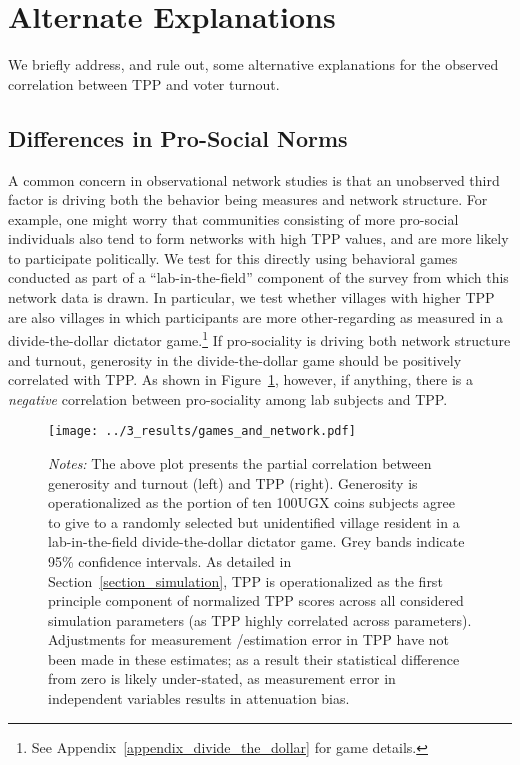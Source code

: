 \documentclass[12pt]{article}
\begin{document}
\section{Alternate Explanations}

We briefly address, and rule out, some alternative explanations for the observed correlation between TPP and voter turnout.


\subsection{Differences in Pro-Social Norms}

A common concern in observational network studies is that an unobserved third factor is driving both the behavior being measures and network structure. For example, one might worry that communities consisting of more pro-social individuals also tend to form networks with high TPP values, and are more likely to participate politically. We test for this directly using behavioral games conducted as part of a ``lab-in-the-field'' component of the survey from which this network data is drawn. In particular, we test whether villages with higher TPP are also villages in which participants are more other-regarding as measured in a divide-the-dollar dictator game.\footnote{See Appendix~\ref{appendix_divide_the_dollar} for game details.} If pro-sociality is driving both network structure and turnout, generosity in the divide-the-dollar game should be positively correlated with TPP. As shown in Figure~\ref{figure_generosity}, however, if anything, there is a \emph{negative} correlation between pro-sociality among lab subjects and TPP.

\begin{figure}[!h]
	\begin{center}
	    \caption{}\label{figure_generosity}
    		\texttt{[image: ../3\_results/games\_and\_network.pdf]}
    \end{center}
	\scriptsize{\emph{Notes:}  The above plot presents the partial correlation between generosity and turnout (left) and TPP (right). Generosity is operationalized as the portion of ten 100UGX coins subjects agree to give to a randomly selected but unidentified village resident in a lab-in-the-field divide-the-dollar dictator game.  Grey bands indicate 95\% confidence intervals. As detailed in Section~\ref{section_simulation}, TPP is operationalized as the first principle component of normalized TPP scores across all considered simulation parameters (as TPP highly correlated across parameters). Adjustments for measurement /estimation error in TPP have not been made in these estimates; as a result their statistical difference from zero is likely under-stated, as measurement error in independent variables results in attenuation bias.}
\end{figure}
\end{document}
